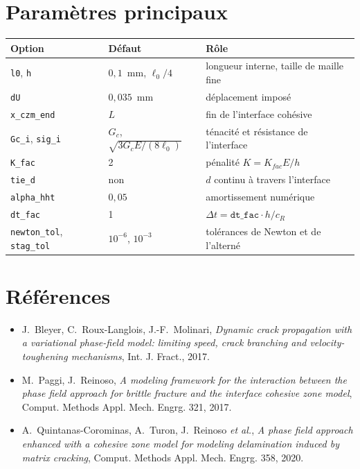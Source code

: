\documentclass[11pt,a4paper]{article}
\begin{document}
\section{Paramètres principaux}
\begin{center}
\begin{tabular}{lll}
\toprule
Option & Défaut & Rôle\\
\midrule
\texttt{l0}, \texttt{h} & $0{,}1$~mm, $\ell_0/4$ & longueur interne, taille de maille fine\\
\texttt{dU} & $0{,}035$~mm & déplacement imposé\\
\texttt{x\_czm\_end} & $L$ & fin de l'interface cohésive\\
\texttt{Gc\_i}, \texttt{sig\_i} & $G_c$, $\sqrt{3G_cE/(8\ell_0)}$ & ténacité et résistance de l'interface\\
\texttt{K\_fac} & 2 & pénalité $K=K_{fac}E/h$\\
\texttt{tie\_d} & non & $d$ continu à travers l'interface\\
\texttt{alpha\_hht} & $0{,}05$ & amortissement numérique\\
\texttt{dt\_fac} & 1 & $\Delta t=\mathtt{dt\_fac}\cdot h/c_R$\\
\texttt{newton\_tol}, \texttt{stag\_tol} & $10^{-6}$, $10^{-3}$ & tolérances de Newton et de l'alterné\\
\bottomrule
\end{tabular}
\end{center}

\section*{Références}
\begin{itemize}
\item J.~Bleyer, C.~Roux-Langlois, J.-F.~Molinari, \emph{Dynamic crack propagation with a variational
phase-field model: limiting speed, crack branching and velocity-toughening mechanisms}, Int. J. Fract., 2017.
\item M.~Paggi, J.~Reinoso, \emph{A modeling framework for the interaction between the phase field approach
for brittle fracture and the interface cohesive zone model}, Comput. Methods Appl. Mech. Engrg. 321, 2017.
\item A.~Quintanas-Corominas, A.~Turon, J.~Reinoso \emph{et al.}, \emph{A phase field approach enhanced with
a cohesive zone model for modeling delamination induced by matrix cracking}, Comput. Methods Appl. Mech.
Engrg. 358, 2020.
\end{itemize}
\end{document}
